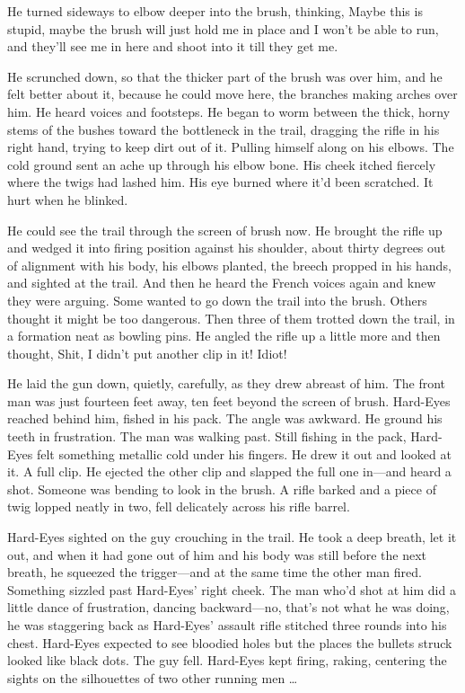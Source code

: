 He turned sideways to elbow deeper into the brush, thinking, Maybe this is stupid, maybe the brush will just hold me in place and I won’t be able to run, and they’ll see me in here and shoot into it till they get me.

He scrunched down, so that the thicker part of the brush was over him, and he felt better about it, because he could move here, the branches making arches over him. He heard voices and footsteps. He began to worm between the thick, horny stems of the bushes toward the bottleneck in the trail, dragging the rifle in his right hand, trying to keep dirt out of it. Pulling himself along on his elbows. The cold ground sent an ache up through his elbow bone. His cheek itched fiercely where the twigs had lashed him. His eye burned where it’d been scratched. It hurt when he blinked.

He could see the trail through the screen of brush now. He brought the rifle up and wedged it into firing position against his shoulder, about thirty degrees out of alignment with his body, his elbows planted, the breech propped in his hands, and sighted at the trail. And then he heard the French voices again and knew they were arguing. Some wanted to go down the trail into the brush. Others thought it might be too dangerous. Then three of them trotted down the trail, in a formation neat as bowling pins. He angled the rifle up a little more and then thought, Shit, I didn’t put another clip in it! Idiot!

He laid the gun down, quietly, carefully, as they drew abreast of him. The front man was just fourteen feet away, ten feet beyond the screen of brush. Hard-Eyes reached behind him, fished in his pack. The angle was awkward. He ground his teeth in frustration. The man was walking past. Still fishing in the pack, Hard-Eyes felt something metallic cold under his fingers. He drew it out and looked at it. A full clip. He ejected the other clip and slapped the full one in—and heard a shot. Someone was bending to look in the brush. A rifle barked and a piece of twig lopped neatly in two, fell delicately across his rifle barrel.

Hard-Eyes sighted on the guy crouching in the trail. He took a deep breath, let it out, and when it had gone out of him and his body was still before the next breath, he squeezed the trigger—and at the same time the other man fired. Something sizzled past Hard-Eyes’ right cheek. The man who’d shot at him did a little dance of frustration, dancing backward—no, that’s not what he was doing, he was staggering back as Hard-Eyes’ assault rifle stitched three rounds into his chest. Hard-Eyes expected to see bloodied holes but the places the bullets struck looked like black dots. The guy fell. Hard-Eyes kept firing, raking, centering the sights on the silhouettes of two other running men …


